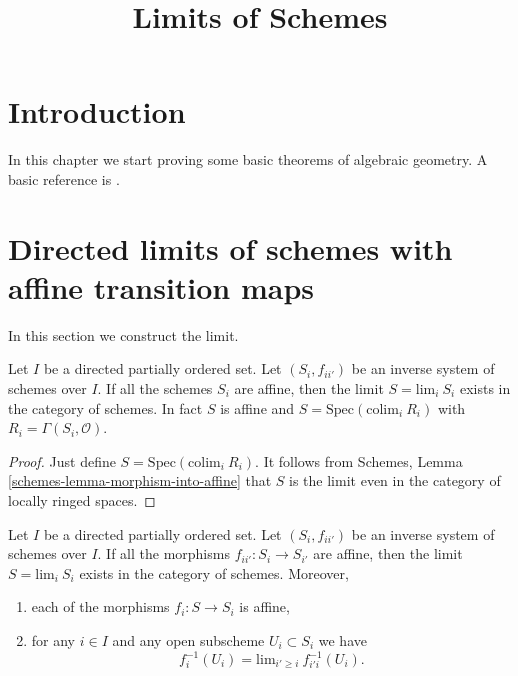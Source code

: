 

%


\title{Limits of Schemes}


\maketitle

\tableofcontents

\section{Introduction}
\label{section-introduction}

\noindent
In this chapter we start proving some basic theorems of algebraic geometry.
A basic reference is \cite{EGA}.




\section{Directed limits of schemes with affine transition maps}
\label{section-limits}

\noindent
In this section we construct the limit.

\begin{lemma}
\label{lemma-directed-inverse-system-affine schemes-has-limit}
Let $I$ be a directed partially ordered set.
Let $(S_i, f_{ii'})$ be an inverse system of
schemes over $I$.  If all the schemes $S_i$
are affine, then the limit $S = \text{lim}_i\ S_i$ exists
in the category of schemes.
In fact $S$ is affine and $S = \text{Spec}(\text{colim}_i\ R_i)$
with $R_i = \Gamma(S_i, \mathcal{O})$.
\end{lemma}

\begin{proof}
Just define $S = \text{Spec}(\text{colim}_i\ R_i)$.
It follows from Schemes, Lemma \ref{schemes-lemma-morphism-into-affine}
that $S$ is the limit even in the category of locally ringed spaces.
\end{proof}

\begin{lemma}
\label{lemma-directed-inverse-system-has-limit}
Let $I$ be a directed partially ordered set.
Let $(S_i, f_{ii'})$ be an inverse system of
schemes over $I$. If all the morphisms $f_{ii'} : S_i \to S_{i'}$
are affine, then the limit $S = \text{lim}_i\ S_i$ exists
in the category of schemes.
Moreover,
\begin{enumerate}
\item each of the morphisms $f_i : S \to S_i$ is affine,
\item for any $i \in I$ and any open subscheme $U_i \subset S_i$
we have
$$
f_i^{-1}(U_i) = \text{lim}_{i' \geq i}\ f_{i'i}^{-1}(U_i).
$$
\end{enumerate}
\end{lemma}

